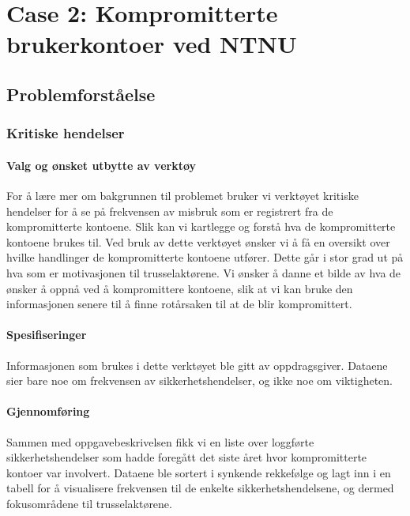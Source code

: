 \newpage
\section{Case 2: Kompromitterte brukerkontoer ved NTNU}

\subsection{Problemforståelse}

\subsubsection{Kritiske hendelser}

\paragraph{Valg og ønsket utbytte av verktøy}
For å lære mer om bakgrunnen til problemet bruker vi verktøyet kritiske hendelser for å se på frekvensen av misbruk som er registrert fra de kompromitterte kontoene. Slik kan vi kartlegge og forstå hva de kompromitterte kontoene brukes til. Ved bruk av dette verktøyet ønsker vi å få en oversikt over hvilke handlinger de kompromitterte kontoene utfører. Dette går i stor grad ut på hva som er motivasjonen til trusselaktørene. Vi ønsker å danne et bilde av hva de ønsker å oppnå ved å kompromittere kontoene, slik at vi kan bruke den informasjonen senere til å finne rotårsaken til at de blir kompromittert. 

\paragraph{Spesifiseringer}
Informasjonen som brukes i dette verktøyet ble gitt av oppdragsgiver. Dataene sier bare noe om frekvensen av sikkerhetshendelser, og ikke noe om viktigheten.

\paragraph{Gjennomføring}
Sammen med oppgavebeskrivelsen fikk vi en liste over loggførte sikkerhetshendelser som hadde foregått det siste året hvor kompromitterte kontoer var involvert. Dataene ble sortert i synkende rekkefølge og lagt inn i en tabell for å visualisere frekvensen til de enkelte sikkerhetshendelsene, og dermed fokusområdene til trusselaktørene. 


